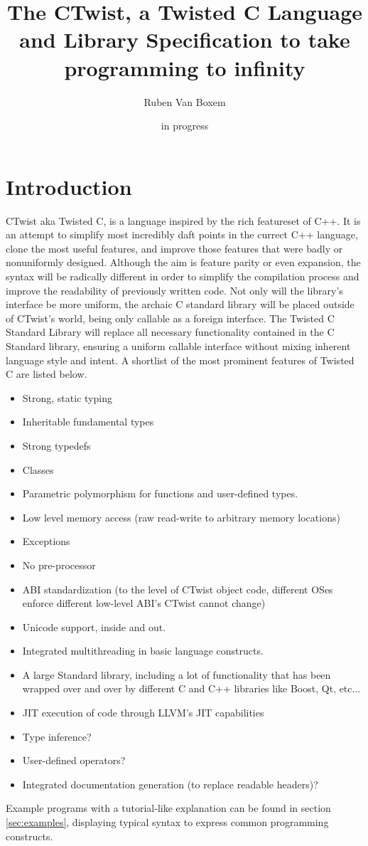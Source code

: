 \documentclass[a4paper,11pt]{article}
\title{The CTwist, a Twisted C Language and Library Specification to take programming to infinity}
\date{in progress}
\author{Ruben Van Boxem}
\begin{document}
\maketitle

\newpage

\tableofcontents
\thispagestyle{empty}
\newpage

\section{Introduction}

CTwist aka Twisted C, is a language inspired by the rich featureset of C++.
It is an attempt to simplify most incredibly daft points in the currect C++ language, clone the most useful features, and improve those features that were badly or nonuniformly designed.
Although the aim is feature parity or even expansion, the syntax will be radically different in order to simplify the compilation process and improve the readability of previously written code.
Not only will the library’s interface be more uniform, the archaic C standard library will be placed outside of CTwist’s world, being only callable as a foreign interface.
The Twisted C Standard Library will replace all necessary functionality contained in the C Standard library, ensuring a uniform callable interface without mixing inherent language style and intent.
A shortlist of the most prominent features of Twisted C are listed below.

\begin{itemize}
  \item Strong, static typing
  \item Inheritable fundamental types
  \item Strong typedefs
  \item Classes
  \item Parametric polymorphism for functions and user-defined types.
  \item Low level memory access (raw read-write to arbitrary memory locations)
  \item Exceptions
  \item No pre-processor
  \item ABI standardization (to the level of CTwist object code, different OSes enforce different low-level ABI’s CTwist cannot change)
  \item Unicode support, inside and out.
  \item Integrated multithreading in basic language constructs.
  \item A large Standard library, including a lot of functionality that has been wrapped over and over by different C and C++ libraries like Boost, Qt, etc...
  \item JIT execution of code through LLVM's JIT capabilities
  \item Type inference?
  \item User-defined operators?
  \item Integrated documentation generation (to replace readable headers)?
\end{itemize}
Example programs with a tutorial-like explanation can be found in section \ref{sec:examples}, displaying typical syntax to express common programming constructs.
\end{document}
